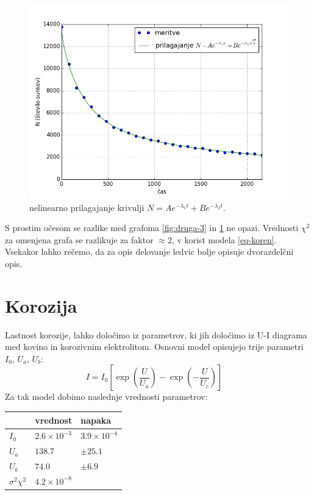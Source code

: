 \documentclass[slovene,11pt,a4paper]{article}
\numberwithin{equation}{section} %
\numberwithin{figure}{section} %
\numberwithin{table}{section} %
\begin{document}
\begin{figure}[h]
\centering
\includegraphics[scale=0.7]{slike/druga_2.png}
\caption[farmacevt-dodatni-parameter]{nelinearno prilagajanje krivulji $N=A e^{- \lambda_1 t} + B e^{- \lambda_2 t}$.}
\label{fig:druga-4}
\end{figure}
\pagebreak
S prostim očesom se razlike med grafoma \ref{fig:druga-3} in \ref{fig:druga-4} ne opazi. Vrednosti $\chi^2$ za omenjena grafa se razlikuje za faktor $\approx2$, v korist modela \ref{eq-koren}. Vsekakor lahko rečemo, da za opis delovanje ledvic bolje opisuje dvorazdelčni opis.

\section{Korozija}
Lastnost korozije, lahko določimo iz parametrov, ki jih določimo iz U-I diagrama med kovino in korozivnim elektrolitom. Osnovni model opisujejo trije parametri $I_0$, $U_a$, $U_b$:
\begin{equation}
\label{eq-korozija-1}
I=I_0\left[\exp\left(\frac{U}{U_a}\right)-\exp\left(-\frac{U}{U_c}\right)\right]\quad
\end{equation}
Za tak model dobimo naslednje vrednosti parametrov:
\begin{table}[h]
\begin{center}
\begin{tabular}{|l|l|l|}
\hline
 & vrednost & napaka \\ \hline
$I_0$ & $2.6\times 10^{-3}$ & $3.9\times 10^{-4}$ \\ \hline
$U_a$ & $138.7$ & $\pm25.1$ \\ \hline
$U_b$ & $74.0$ & $\pm6.9$ \\ \hline
$\sigma^2 \chi^2$ & $4.2\times 10^{-8}$ &  \\ \hline
\end{tabular}
\end{center}
\end{table}
\end{document}
